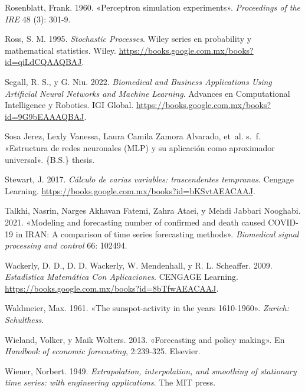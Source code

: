 \documentclass[
  us-letterpaper,
]{scrreprt}
\newlength{\cslhangindent}
\newenvironment{CSLReferences}[2] %
 {\begin{list}{}{%
  \setlength{\itemindent}{0pt}
  \setlength{\leftmargin}{0pt}
  \setlength{\parsep}{0pt}
  \ifodd #1
   \setlength{\leftmargin}{\cslhangindent}
   \setlength{\itemindent}{-1\cslhangindent}
  \fi
  \setlength{\itemsep}{#2\baselineskip}}}
 {\end{list}}
\theoremstyle{plain}
\theoremstyle{definition}
\theoremstyle{definition}
\theoremstyle{plain}
\theoremstyle{remark}
\begin{document}
\begin{CSLReferences}{1}{0}
Rosenblatt, Frank. 1960. {«Perceptron simulation experiments»}.
\emph{Proceedings of the IRE} 48 (3): 301-9.

Ross, S. M. 1995. \emph{Stochastic Processes}. Wiley series en
probability y mathematical statistics. Wiley.
\url{https://books.google.com.mx/books?id=qiLdCQAAQBAJ}.

Segall, R. S., y G. Niu. 2022. \emph{Biomedical and Business
Applications Using Artificial Neural Networks and Machine Learning}.
Advances en Computational Intelligence y Robotics. IGI Global.
\url{https://books.google.com.mx/books?id=9G9bEAAAQBAJ}.

Sosa Jerez, Lexly Vanessa, Laura Camila Zamora Alvarado, et~al. s.~f.
{«Estructura de redes neuronales (MLP) y su aplicaci{ó}n como
aproximador universal»}. \{B.S.\} thesis.

Stewart, J. 2017. \emph{C{á}lculo de varias variables: trascendentes
tempranas}. Cengage Learning.
\url{https://books.google.com.mx/books?id=bKSvtAEACAAJ}.

Talkhi, Nasrin, Narges Akhavan Fatemi, Zahra Ataei, y Mehdi Jabbari
Nooghabi. 2021. {«Modeling and forecasting number of confirmed and death
caused COVID-19 in IRAN: A comparison of time series forecasting
methods»}. \emph{Biomedical signal processing and control} 66: 102494.

Wackerly, D. D., D. D. Wackerly, W. Mendenhall, y R. L. Scheaffer. 2009.
\emph{Estad{ı́}stica Matem{á}tica Con Aplicaciones}. CENGAGE Learning.
\url{https://books.google.com.mx/books?id=8bTfwAEACAAJ}.

Waldmeier, Max. 1961. {«The sunspot-activity in the years 1610-1960»}.
\emph{Zurich: Schulthess}.

Wieland, Volker, y Maik Wolters. 2013. {«Forecasting and policy
making»}. En \emph{Handbook of economic forecasting}, 2:239-325.
Elsevier.

Wiener, Norbert. 1949. \emph{Extrapolation, interpolation, and smoothing
of stationary time series: with engineering applications}. The MIT
press.


\end{CSLReferences}
\end{document}
